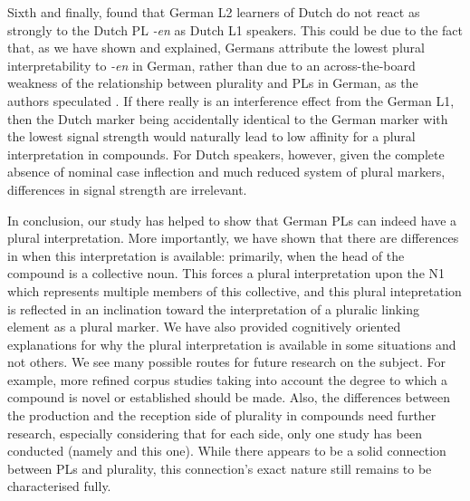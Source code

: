 Sixth and finally, \textcite{BangaEa2013a} found that German L2 learners of Dutch do not react as strongly to the Dutch PL \textit{-en} as Dutch L1 speakers.
This could be due to the fact that, as we have shown and explained, Germans attribute the lowest plural interpretability to \textit{-en} in German, rather than due to an across-the-board weakness of the relationship between plurality and PLs in German, as the authors speculated \parencite[45]{BangaEa2013a}.
If there really is an interference effect from the German L1, then the Dutch marker being accidentally identical to the German marker with the lowest signal strength would naturally lead to low affinity for a plural interpretation in compounds.
For Dutch speakers, however, given the complete absence of nominal case inflection and much reduced system of plural markers, differences in signal strength are irrelevant.

In conclusion, our study has helped to show that German PLs can indeed have a plural interpretation.
More importantly, we have shown that there are differences in when this interpretation is available: primarily, when the head of the compound is a collective noun.
This forces a plural interpretation upon the N1 which represents multiple members of this collective, and this plural intepretation is reflected in an inclination toward the interpretation of a pluralic linking element as a plural marker.
We have also provided cognitively oriented explanations for why the plural interpretation is available in some situations and not others.
We see many possible routes for future research on the subject.
For example, more refined corpus studies taking into account the degree to which a compound is novel or established should be made.
Also, the differences between the production and the reception side of plurality in compounds need further research, especially considering that for each side, only one study has been conducted (namely \citealt{KoesterEa2004} and this one).
While there appears to be a solid connection between PLs and plurality, this connection's exact nature still remains to be characterised fully.
